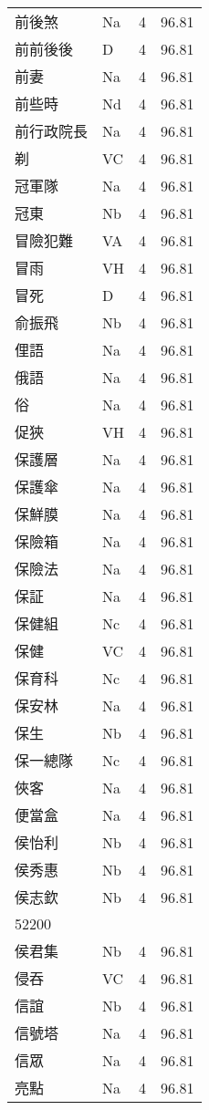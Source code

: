 \documentclass[twocolumn]{book}
\begin{document}
\begin{supertabular}{llrr}
前後煞 & Na & 4 &  96.81\\
前前後後 & D & 4 &  96.81\\
前妻 & Na & 4 &  96.81\\
前些時 & Nd & 4 &  96.81\\
前行政院長 & Na & 4 &  96.81\\
剃 & VC & 4 &  96.81\\
冠軍隊 & Na & 4 &  96.81\\
冠東 & Nb & 4 &  96.81\\
冒險犯難 & VA & 4 &  96.81\\
冒雨 & VH & 4 &  96.81\\
冒死 & D & 4 &  96.81\\
俞振飛 & Nb & 4 &  96.81\\
俚語 & Na & 4 &  96.81\\
俄語 & Na & 4 &  96.81\\
俗 & Na & 4 &  96.81\\
促狹 & VH & 4 &  96.81\\
保護層 & Na & 4 &  96.81\\
保護傘 & Na & 4 &  96.81\\
保鮮膜 & Na & 4 &  96.81\\
保險箱 & Na & 4 &  96.81\\
保險法 & Na & 4 &  96.81\\
保証 & Na & 4 &  96.81\\
保健組 & Nc & 4 &  96.81\\
保健 & VC & 4 &  96.81\\
保育科 & Nc & 4 &  96.81\\
保安林 & Na & 4 &  96.81\\
保生 & Nb & 4 &  96.81\\
保一總隊 & Nc & 4 &  96.81\\
俠客 & Na & 4 &  96.81\\
便當盒 & Na & 4 &  96.81\\
侯怡利 & Nb & 4 &  96.81\\
侯秀惠 & Nb & 4 &  96.81\\
侯志欽 & Nb & 4 &  96.81\\
52200\\
侯君集 & Nb & 4 &  96.81\\
侵吞 & VC & 4 &  96.81\\
信誼 & Nb & 4 &  96.81\\
信號塔 & Na & 4 &  96.81\\
信眾 & Na & 4 &  96.81\\
亮點 & Na & 4 &  96.81\\

\end{supertabular}
\end{document}
